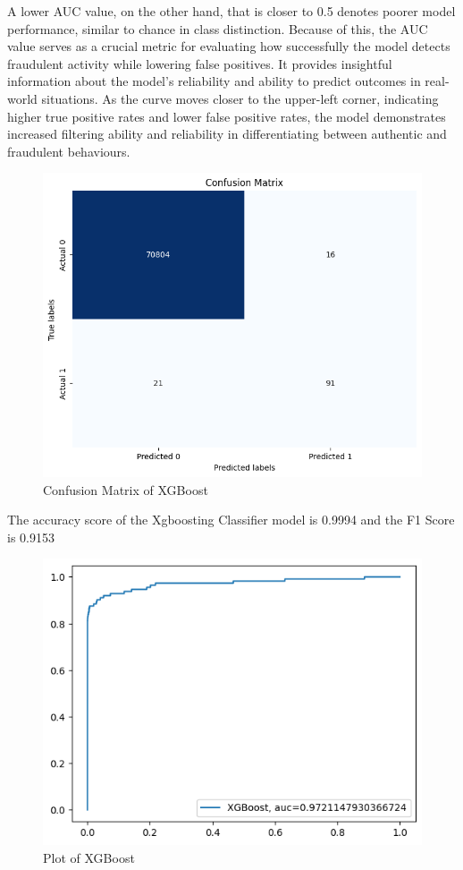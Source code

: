  A lower AUC value, on the other hand, that is closer to 0.5 denotes poorer model performance, similar to chance in class distinction. Because of this, the AUC value serves as a crucial metric for evaluating how successfully the model detects fraudulent activity while lowering false positives. It provides insightful information about the model's reliability and ability to predict outcomes in real-world situations. As the curve moves closer to the upper-left corner, indicating higher true positive rates and lower false positive rates, the model demonstrates increased filtering ability and reliability in differentiating between authentic and fraudulent behaviours. 


\begin{figure}[ht]
    \centering
    \includegraphics[scale=0.7]{figures/CM_XGBoost.png}
    \caption{Confusion Matrix of XGBoost}
    \label{fig:Plot of the Data}
\end{figure}
 The accuracy score of the Xgboosting Classifier model is 0.9994 and the F1 Score is 0.9153 

 \begin{figure}[ht]
    \centering
    \includegraphics[scale=0.7]{figures/XGBoost.png}
    \caption{Plot of XGBoost }
    \label{fig:Plot of the Data}
\end{figure}

